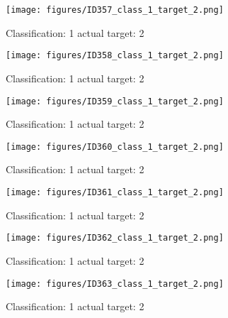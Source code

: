 \begin{figure}[h!]
\begin{center}
\texttt{[image: figures/ID357\_class\_1\_target\_2.png]}
\end{center}
\caption{ Classification: 1 actual target: 2}
\label{fig:ID357_class_1_target_2}
\end{figure}
\begin{figure}[h!]
\begin{center}
\texttt{[image: figures/ID358\_class\_1\_target\_2.png]}
\end{center}
\caption{ Classification: 1 actual target: 2}
\label{fig:ID358_class_1_target_2}
\end{figure}
\begin{figure}[h!]
\begin{center}
\texttt{[image: figures/ID359\_class\_1\_target\_2.png]}
\end{center}
\caption{ Classification: 1 actual target: 2}
\label{fig:ID359_class_1_target_2}
\end{figure}
\begin{figure}[h!]
\begin{center}
\texttt{[image: figures/ID360\_class\_1\_target\_2.png]}
\end{center}
\caption{ Classification: 1 actual target: 2}
\label{fig:ID360_class_1_target_2}
\end{figure}
\begin{figure}[h!]
\begin{center}
\texttt{[image: figures/ID361\_class\_1\_target\_2.png]}
\end{center}
\caption{ Classification: 1 actual target: 2}
\label{fig:ID361_class_1_target_2}
\end{figure}
\begin{figure}[h!]
\begin{center}
\texttt{[image: figures/ID362\_class\_1\_target\_2.png]}
\end{center}
\caption{ Classification: 1 actual target: 2}
\label{fig:ID362_class_1_target_2}
\end{figure}
\begin{figure}[h!]
\begin{center}
\texttt{[image: figures/ID363\_class\_1\_target\_2.png]}
\end{center}
\caption{ Classification: 1 actual target: 2}
\label{fig:ID363_class_1_target_2}
\end{figure}
